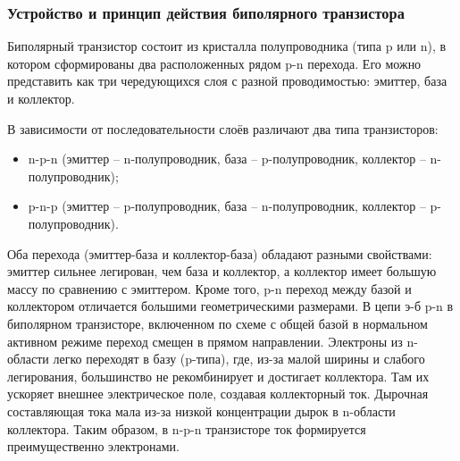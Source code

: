\subsubsection{Устройство и принцип действия биполярного транзистора}
Биполярный транзистор состоит из кристалла полупроводника (типа p или n), в котором сформированы два расположенных рядом p-n перехода. Его можно представить как три чередующихся слоя с разной проводимостью: эмиттер, база и коллектор.

В зависимости от последовательности слоёв различают два типа транзисторов:
\begin{itemize}
\item n-p-n (эмиттер – n-полупроводник, база – p-полупроводник, коллектор – n-полупроводник);
\item p-n-p (эмиттер – p-полупроводник, база – n-полупроводник, коллектор – p-полупроводник).
\end{itemize}
Оба перехода (эмиттер-база и коллектор-база) обладают разными свойствами: эмиттер сильнее легирован, чем база и коллектор, а коллектор имеет большую массу по сравнению с эмиттером. Кроме того, p-n переход между базой и коллектором отличается большими геометрическими размерами.
В цепи э-б p-n в биполярном
транзисторе, включенном по схеме с общей базой в нормальном активном режиме переход смещен в прямом направлении. Электроны из n-области легко переходят в базу (p-типа), где, из-за малой ширины и слабого легирования, большинство не рекомбинирует и достигает коллектора. Там их ускоряет внешнее электрическое поле, создавая коллекторный ток. Дырочная составляющая тока мала из-за низкой концентрации дырок в n-области коллектора. Таким образом, в n-p-n транзисторе ток формируется преимущественно электронами.
